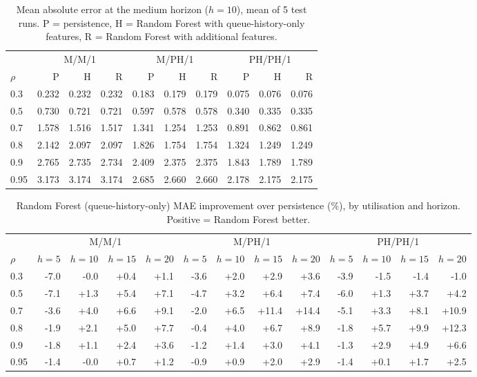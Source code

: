 \begin{table}[htbp]
\centering
\small
\caption{Mean absolute error at the medium horizon ($h=10$), mean of 5 test runs. P = persistence, H = Random Forest with queue-history-only features, R = Random Forest with additional features.}
\label{tab:consolidated_mae_medium}
\begin{tabular}{lrrrrrrrrr}
\toprule
 & \multicolumn{3}{c}{M/M/1} & \multicolumn{3}{c}{M/PH/1} & \multicolumn{3}{c}{PH/PH/1} \\
\cmidrule(lr){2-4}\cmidrule(lr){5-7}\cmidrule(lr){8-10}
$\rho$ & P & H & R & P & H & R & P & H & R \\
\midrule
0.3 & 0.232 & 0.232 & 0.232 & 0.183 & 0.179 & 0.179 & 0.075 & 0.076 & 0.076 \\
0.5 & 0.730 & 0.721 & 0.721 & 0.597 & 0.578 & 0.578 & 0.340 & 0.335 & 0.335 \\
0.7 & 1.578 & 1.516 & 1.517 & 1.341 & 1.254 & 1.253 & 0.891 & 0.862 & 0.861 \\
0.8 & 2.142 & 2.097 & 2.097 & 1.826 & 1.754 & 1.754 & 1.324 & 1.249 & 1.249 \\
0.9 & 2.765 & 2.735 & 2.734 & 2.409 & 2.375 & 2.375 & 1.843 & 1.789 & 1.789 \\
0.95 & 3.173 & 3.174 & 3.174 & 2.685 & 2.660 & 2.660 & 2.178 & 2.175 & 2.175 \\
\bottomrule
\end{tabular}
\end{table}

\begin{table}[htbp]
\centering
\footnotesize
\setlength{\tabcolsep}{3.5pt}
\caption{Random Forest (queue-history-only) MAE improvement over persistence (\%), by utilisation and horizon. Positive = Random Forest better.}
\label{tab:consolidated_mae_impr}
\begin{tabular}{lrrrrrrrrrrrr}
\toprule
 & \multicolumn{4}{c}{M/M/1} & \multicolumn{4}{c}{M/PH/1} & \multicolumn{4}{c}{PH/PH/1} \\
\cmidrule(lr){2-5}\cmidrule(lr){6-9}\cmidrule(lr){10-13}
$\rho$ & $h=5$ & $h=10$ & $h=15$ & $h=20$ & $h=5$ & $h=10$ & $h=15$ & $h=20$ & $h=5$ & $h=10$ & $h=15$ & $h=20$ \\
\midrule
0.3 & -7.0 & -0.0 & +0.4 & +1.1 & -3.6 & +2.0 & +2.9 & +3.6 & -3.9 & -1.5 & -1.4 & -1.0 \\
0.5 & -7.1 & +1.3 & +5.4 & +7.1 & -4.7 & +3.2 & +6.4 & +7.4 & -6.0 & +1.3 & +3.7 & +4.2 \\
0.7 & -3.6 & +4.0 & +6.6 & +9.1 & -2.0 & +6.5 & +11.4 & +14.4 & -5.1 & +3.3 & +8.1 & +10.9 \\
0.8 & -1.9 & +2.1 & +5.0 & +7.7 & -0.4 & +4.0 & +6.7 & +8.9 & -1.8 & +5.7 & +9.9 & +12.3 \\
0.9 & -1.8 & +1.1 & +2.4 & +3.6 & -1.2 & +1.4 & +3.0 & +4.1 & -1.3 & +2.9 & +4.9 & +6.6 \\
0.95 & -1.4 & -0.0 & +0.7 & +1.2 & -0.9 & +0.9 & +2.0 & +2.9 & -1.4 & +0.1 & +1.7 & +2.5 \\
\bottomrule
\end{tabular}
\end{table}

